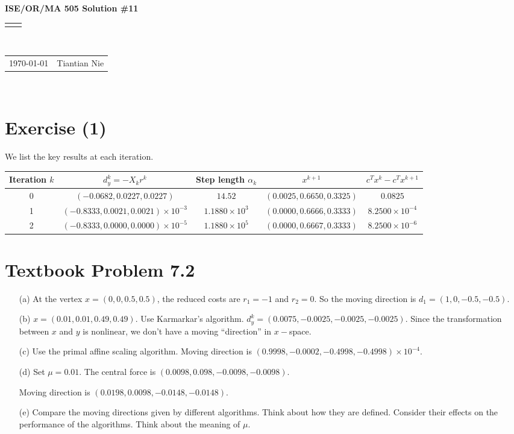 \documentclass[11pt]{article}
\renewcommand{\title}[1]{\textbf{#1}\\}
\renewcommand{\line}{\begin{tabularx}{\textwidth}{X>{\raggedleft}X}\hline\\\end{tabularx}\\[-0.5cm]}
\newcommand{\leftright}[2]{\begin{tabularx}{\textwidth}{X>{\raggedleft}X}#1%
& #2\\\end{tabularx}\\[-0.5cm]}
\begin{document}
\title{ISE/OR/MA 505 Solution \#11}
\line
\leftright{\today}{Tiantian Nie} %

\section*{Exercise (1)}
We list the key results at each iteration.
\begin{table}[h]
\centering
    \begin{tabular}{|c|c|c|c|c|}
      \hline
      Iteration $k$ & $d_y^k=-X_kr^k$ & Step length $\alpha_k$ & $x^{k+1}$ & $c^Tx^k - c^Tx^{k+1}$ \\\hline
      0 & $(-0.0682,0.0227,0.0227)$ & $14.52$ & $(0.0025,0.6650,0.3325)$ & $0.0825$ \\\hline
      1 & $(-0.8333,0.0021,0.0021)\times 10^{-3}$ & $1.1880\times 10^3$ & $(0.0000,0.6666,0.3333)$ & $8.2500\times 10^{-4}$ \\\hline
      2 & $(-0.8333,0.0000,0.0000)\times 10^{-5}$ & $1.1880\times 10^5$ & $(0.0000,0.6667,0.3333)$ & $8.2500\times 10^{-6}$ \\\hline
    \end{tabular}
\end{table}

\section*{Textbook Problem 7.2}

\begin{itemize}
  \item[(a)] At the vertex $x=(0,0,0.5,0.5)$, the reduced costs are $r_1=-1$ and $r_2=0$. So the moving direction is $d_1=(1,0,-0.5,-0.5)$.
  \item[(b)] $x=(0.01,0.01,0.49,0.49)$. Use Karmarkar's algorithm. $d^k_y=(0.0075,-0.0025,-0.0025,-0.0025)$. Since the transformation between $x$ and $y$ is nonlinear, we don't have a moving ``direction'' in $x-$space.
  \item[(c)] Use the primal affine scaling algorithm. Moving direction is $(0.9998,-0.0002,-0.4998,-0.4998)\times 10^{-4}$.
  \item[(d)] Set $\mu=0.01$. The central force is $(0.0098,0.098,-0.0098,-0.0098)$.

  Moving direction is $(0.0198,0.0098,-0.0148,-0.0148)$.
  \item[(e)] Compare the moving directions given by different algorithms. Think about how they are defined. Consider their effects on the performance of the algorithms. Think about the meaning of $\mu$.
\end{itemize}
\end{document}
